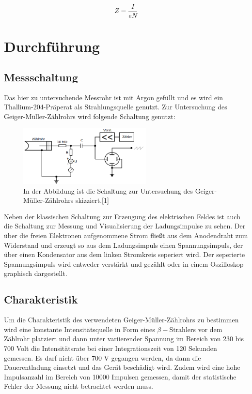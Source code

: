\documentclass[titlepage = firstcover]{scrartcl}
\begin{document}
            \begin{equation}
                Z =  \frac{I}{eN}
                \label{eqn:Ladung}
            \end{equation}
    
    \newpage
    \section{Durchführung}
        \subsection{Messschaltung}
            Das hier zu untersuchende Messrohr ist mit Argon gefüllt und es wird ein Thallium-204-Präperat als Strahlungsquelle genutzt.
            Zur Untersuchung des Geiger-Müller-Zählrohrs wird folgende Schaltung genutzt:

            \FloatBarrier

                \begin{figure}[h]
                  \centering
                  \includegraphics[width = 0.6\textwidth]{Bilder/Messaufbau.png}
                  \caption{In der Abbildung ist die Schaltung zur Untersuchung des Geiger-Müller-Zählrohrs skizziert.[1]}
                  \label{fig:Messaufbau}
                \end{figure}

            \FloatBarrier
            \noindent
            Neben der klassischen Schaltung zur Erzeugung des elektrischen Feldes ist auch die Schaltung zur Messung und Visualisierung der Ladungsimpulse zu sehen. Der über die freien Elektronen
            aufgenommene Strom fließt aus dem Anodendraht zum Widerstand und erzeugt so aus dem Ladungsimpuls einen Spannungsimpuls, der über einen Kondensator aus dem linken Stromkreis seperiert wird.
            Der seperierte Spannungsimpuls wird entweder verstärkt und gezählt oder in einem Oszilloskop graphisch dargestellt.

        \subsection{Charakteristik}
            Um die Charakteristik des verwendeten Geiger-Müller-Zählrohrs zu bestimmen wird eine konstante Intensitätsquelle in Form eines $\beta-$Strahlers vor dem Zählrohr platziert und dann unter 
            variierender Spannung im Bereich von 230 bis 700 Volt die Intensitätsrate bei einer Integrationszeit von 120 Sekunden gemessen. Es darf nicht über 700 V gegangen werden, da dann die 
            Dauerentladung einsetzt und das Gerät beschädigt wird. Zudem wird eine hohe Impulsanzahl im Bereich von 10000 Impulsen gemessen, damit der statistische Fehler der Messung nicht betrachtet
            werden muss. 
\end{document}
